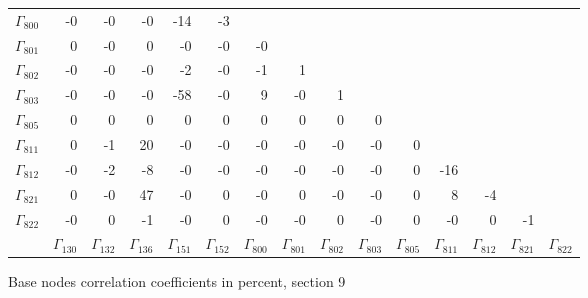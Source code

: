 {\begin{table}
\begin{center}
\begin{minipage}{\linewidth}
\begin{center}
\begin{envsmall}
\begin{center}
\begin{tabular}{rrrrrrrrrrrrrrr}
\( \Gamma_{800} \) &   -0 &   -0 &   -0 &  -14 &   -3 &  &  &  &  &  &  &  &  &  \\
\( \Gamma_{801} \) &    0 &   -0 &    0 &   -0 &   -0 &   -0 &  &  &  &  &  &  &  &  \\
\( \Gamma_{802} \) &   -0 &   -0 &   -0 &   -2 &   -0 &   -1 &    1 &  &  &  &  &  &  &  \\
\( \Gamma_{803} \) &   -0 &   -0 &   -0 &  -58 &   -0 &    9 &   -0 &    1 &  &  &  &  &  &  \\
\( \Gamma_{805} \) &    0 &    0 &    0 &    0 &    0 &    0 &    0 &    0 &    0 &  &  &  &  &  \\
\( \Gamma_{811} \) &    0 &   -1 &   20 &   -0 &   -0 &   -0 &   -0 &   -0 &   -0 &    0 &  &  &  &  \\
\( \Gamma_{812} \) &   -0 &   -2 &   -8 &   -0 &   -0 &   -0 &   -0 &   -0 &   -0 &    0 &  -16 &  &  &  \\
\( \Gamma_{821} \) &    0 &   -0 &   47 &   -0 &    0 &   -0 &    0 &   -0 &   -0 &    0 &    8 &   -4 &  &  \\
\( \Gamma_{822} \) &   -0 &    0 &   -1 &   -0 &    0 &   -0 &   -0 &    0 &   -0 &    0 &   -0 &    0 &   -1 &  \\
 & \( \Gamma_{130} \) & \( \Gamma_{132} \) & \( \Gamma_{136} \) & \( \Gamma_{151} \) & \( \Gamma_{152} \) & \( \Gamma_{800} \) & \( \Gamma_{801} \) & \( \Gamma_{802} \) & \( \Gamma_{803} \) & \( \Gamma_{805} \) & \( \Gamma_{811} \) & \( \Gamma_{812} \) & \( \Gamma_{821} \) & \( \Gamma_{822} \)
\\\hline
\end{tabular}
\end{center}
\end{envsmall}
\ifhevea\else
\end{center}
\end{minipage}
\fi
\end{center}
\ifhevea\end{table}\fi
\ifhevea\begin{table}\fi%
\begin{center}
\ifhevea
\caption{Base nodes correlation coefficients in percent, section 9\label{tab:tau:br-fit-corr9}}%
\else
\begin{minipage}{\linewidth}
\begin{center}
\label{tab:tau:br-fit-corr9}%
\fi
\begin{envsmall}

\end{envsmall}
\end{center}
\end{minipage}
\end{center}
\end{table}}
